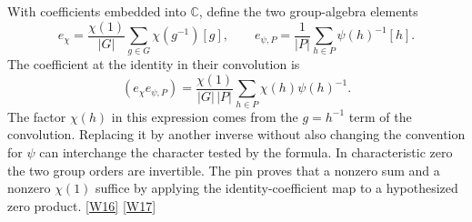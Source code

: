 \documentclass[12pt,letterpaper]{article}
\begin{document}
With coefficients embedded into \(\mathbb C\), define the two group-algebra elements
\[
 e_\chi=\frac{\chi(1)}{|G|}\sum_{g\in G}\chi(g^{-1})[g],
 \qquad
 e_{\psi,P}=\frac1{|P|}\sum_{h\in P}\psi(h)^{-1}[h].
\]
The coefficient at the identity in their convolution is
\begin{equation}
 [1](e_\chi e_{\psi,P})
    =\frac{\chi(1)}{|G|\,|P|}
       \sum_{h\in P}\chi(h)\psi(h)^{-1}.
 \label{eq:weil-idcoeff}
\end{equation}
The factor \(\chi(h)\) in this expression comes from the \(g=h^{-1}\) term of the convolution. Replacing it by another inverse without also changing the convention for \(\psi\) can interchange the character tested by the formula. In characteristic zero the two group orders are invertible. The pin proves that a nonzero sum and a nonzero \(\chi(1)\) suffice by applying the identity-coefficient map to a hypothesized zero product. \href{https://github.com/nousentllc/riemann-hypothesis/blob/40e56bab026552e089d7afcfeff08d2defb9c005/src/Development/AbelianVarietyTheory/Proofs/DivisorProofs/ChiIdemMulLvlIdemBaseNeZero.lean#L147-L163}{\textsf{[W16]}} \href{https://github.com/nousentllc/riemann-hypothesis/blob/40e56bab026552e089d7afcfeff08d2defb9c005/src/Development/AbelianVarietyTheory/Proofs/SatakeParameters/ExistsLevelVectorGoodTypeStableSubspace.lean#L99-L202}{\textsf{[W17]}}
\end{document}
